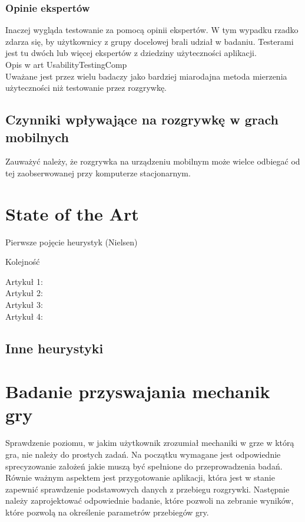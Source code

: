 \documentclass[a4paper,12pt,numbers=noenddot]{report}
\begin{document}
\subsection{Opinie ekspertów}
Inaczej wygląda testowanie za pomocą opinii ekspertów. W tym wypadku rzadko zdarza się, by użytkownicy z grupy docelowej brali udział w badaniu. Testerami jest tu dwóch lub więcej ekspertów z dziedziny użyteczności aplikacji.
\\
Opis w art UsabilityTestingComp
\\
Uważane jest przez wielu badaczy jako bardziej miarodajna metoda mierzenia użyteczności niż testowanie przez rozgrywkę. \cite{art_UsabilityTestingComp}

\section{Czynniki wpływające na rozgrywkę w grach mobilnych}
Zauważyć należy, że rozgrywka na urządzeniu mobilnym może wielce odbiegać od tej zaobserwowanej przy komputerze stacjonarnym. 
\chapter{State of the Art}

Pierwsze pojęcie heurystyk (Nielsen) \cite{art_Nielsen}

Kolejność 

Artykuł 1: \cite{art_UsabilityEvaluationSystematicReview}\\
Artykuł 2: \cite{art_evaluationOfMGevaluationSystem}\\
Artykuł 3: \cite{art_playabilityHeuristics}\\
Artykuł 4: \cite{art_evaluationOfMG}


\section{Inne heurystyki}

\chapter{Badanie przyswajania mechanik gry}
Sprawdzenie poziomu, w jakim użytkownik zrozumiał mechaniki w grze w którą gra, nie należy do prostych zadań. Na początku wymagane jest odpowiednie sprecyzowanie założeń jakie muszą być spełnione do przeprowadzenia badań. Równie ważnym aspektem jest przygotowanie aplikacji, która jest w stanie zapewnić sprawdzenie podstawowych danych z przebiegu rozgrywki. Następnie należy zaprojektować odpowiednie badanie, które pozwoli na zebranie wyników, które pozwolą na określenie parametrów przebiegów gry.
\end{document}
